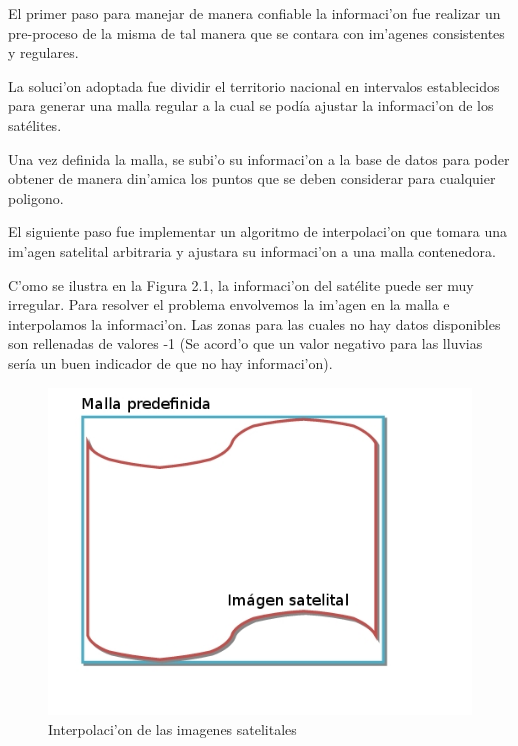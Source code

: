   El primer paso para manejar de manera confiable la informaci'on fue realizar un pre-proceso de la misma
  de tal manera que se contara con im'agenes consistentes y regulares.

  La soluci'on adoptada fue dividir el territorio nacional en intervalos establecidos para generar una malla regular
  a la cual se podía ajustar la informaci'on de los satélites.

  Una vez definida la malla, se subi'o su informaci'on a la base de datos para poder obtener 
  de manera din'amica los puntos que se deben considerar para cualquier poligono. 

  El siguiente paso fue implementar un algoritmo de interpolaci'on que tomara una im'agen satelital arbitraria y 
  ajustara su informaci'on a una malla contenedora.

  C'omo se ilustra en la Figura 2.1, la informaci'on del satélite puede ser muy irregular. Para resolver el problema 
  envolvemos la im'agen en la malla e interpolamos la informaci'on. Las zonas para las cuales no hay datos disponibles
  son rellenadas de valores -1 (Se acord'o que un valor negativo para las lluvias sería un buen indicador de que no hay
  informaci'on).

  \begin{figure}[h!]
  \centering
  \includegraphics[width=120mm,bb=0 0 502 388]{./imagenes/malla.jpg}
  \caption{Interpolaci'on de las imagenes satelitales}
  \end{figure}

